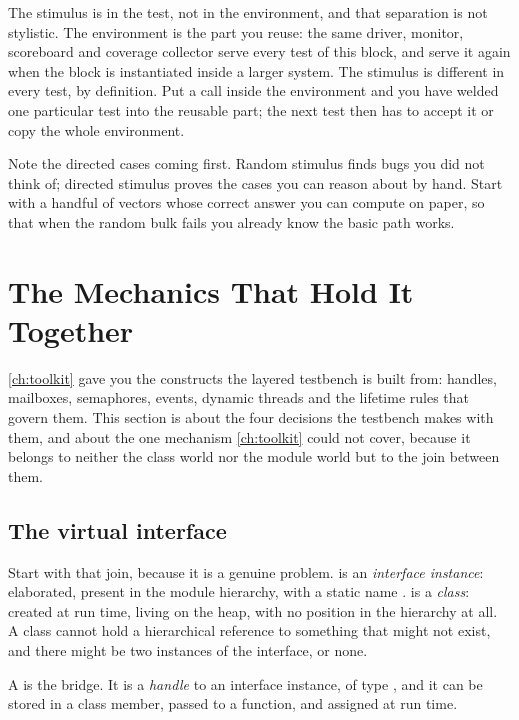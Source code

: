 The stimulus is in the test, not in the environment, and that separation is not
stylistic. The environment is the part you reuse: the same driver, monitor,
scoreboard and coverage collector serve every test of this block, and serve it
again when the block is instantiated inside a larger system. The stimulus is
different in every test, by definition. Put a  call
inside the environment and you have welded one particular test into the
reusable part; the next test then has to accept it or copy the whole
environment.

Note the directed cases coming first. Random stimulus finds bugs you did not
think of; directed stimulus proves the cases you can reason about by hand.
Start with a handful of vectors whose correct answer you can compute on paper,
so that when the random bulk fails you already know the basic path works.

\section{The Mechanics That Hold It Together}
\label{sec:tb:mech}

\cref{ch:toolkit} gave you the constructs the layered testbench is built from:
handles, mailboxes, semaphores, events, dynamic threads and the lifetime
rules that govern them. This section is about the four decisions the testbench
makes with them, and about the one mechanism \cref{ch:toolkit} could not
cover, because it belongs to neither the class world nor the module world but
to the join between them.

\subsection{The virtual interface}

Start with that join, because it is a genuine
problem.  is an \emph{interface instance}:
elaborated, present in the module hierarchy, with a static name
.  is a \emph{class}: created at
run time, living on the heap, with no position in the hierarchy at all. A class
cannot hold a hierarchical reference to something that might not exist, and
there might be two instances of the interface, or none.

A  is the bridge. It is a \emph{handle} to an interface
instance, of type , and it can be stored in a class
member, passed to a function, and assigned at run time.

